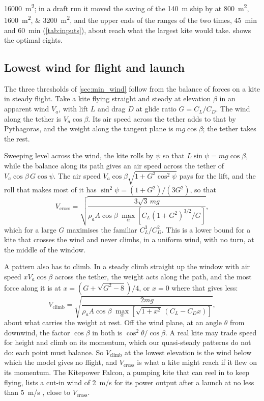 \SI{16000}{m^2}; in a draft run it moved the saving of the \SI{140}{m} ship by  at \SIlist{800;1600;3200}{m^2}, and the upper ends of the ranges of the two times, \SI{45}{min} and \SI{60}{min} (\cref{tab:inputs}), about reach what the largest kite would take.  shows the optimal eights.

\subsection{Lowest wind for flight and launch}
\label{sec:det_min_wind}

The three thresholds of \cref{sec:min_wind} follow from the balance of forces on a kite in steady flight. Take a kite flying straight and steady at elevation $\beta$ in an apparent wind $V_a$, with lift $L$ and drag $D$ at glide ratio $G=C_L/C_D$. The wind along the tether is $V_a\cos\beta$. Its air speed across the tether adds to that by Pythagoras, and the weight along the tangent plane is $mg\cos\beta$; the tether takes the rest.

Sweeping level across the wind, the kite rolls by $\psi$ so that $L\sin\psi=mg\cos\beta$, while the balance along its path gives an air speed across the tether of $V_a\cos\beta\,G\cos\psi$. The air speed $V_a\cos\beta\sqrt{1+G^2\cos^2\psi}$ pays for the lift, and the roll that makes most of it has $\sin^2\psi=(1+G^2)/(3G^2)$, so that
\begin{equation}
V_\mathrm{cross} = \sqrt{\frac{3\sqrt{3}\,mg}{\rho_a A\cos\beta\;\max_\alpha\left[C_L(1+G^2)^{3/2}/G\right]}},
\label{eq:min_cross}
\end{equation}
which for a large $G$ maximises the familiar $C_L^3/C_D^2$. This is a lower bound for a kite that crosses the wind and never climbs, in a uniform wind, with no turn, at the middle of the window.

A pattern also has to climb. In a steady climb straight up the window with air speed $xV_a\cos\beta$ across the tether, the weight acts along the path, and the most force along it is at $x=(G+\sqrt{G^2-8})/4$, or $x=0$ where that gives less:
\begin{equation}
V_\mathrm{climb} = \sqrt{\frac{2mg}{\rho_a A\cos\beta\;\max_\alpha\left[\sqrt{1+x^2}\,(C_L-C_D x)\right]}},
\label{eq:min_climb}
\end{equation}
about what carries the weight at rest. Off the wind plane, at an angle $\theta$ from downwind, the factor $\cos\beta$ in both is $\cos^2\theta/\cos\beta$. A real kite may trade speed for height and climb on its momentum, which our quasi-steady patterns do not do: each point must balance. So $V_\mathrm{climb}$ at the lowest elevation is the wind below which the model gives no flight, and $V_\mathrm{cross}$ is what a kite might reach if it flew on its momentum. The Kitepower Falcon, a pumping kite that can reel in to keep flying, lists a cut-in wind of \SI{2}{m/s} for its power output after a launch at no less than \SI{5}{m/s} \citep{kitepower2024}, close to $V_\mathrm{cross}$.

